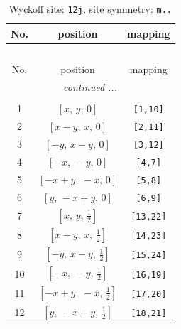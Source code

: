 \documentclass[fleqn,8pt]{jsarticle}
\begin{document}
\begin{longtable}{ccc}
\caption{Wyckoff site: {\tt 12j}, site symmetry: {\tt m..}}
 \\
 \hline \hline
No. & position & mapping \\ \hline \endfirsthead

\multicolumn{2}{l}{\tablename\ \thetable{}} \\
 \hline \hline
No. & position & mapping \\ \hline \endhead

 \hline \hline
\multicolumn{2}{r}{\footnotesize\it continued ...} \\ \endfoot

 \hline \hline
\multicolumn{2}{r}{} \\ \endlastfoot

1 & $\left[ x,\, y,\, 0 \right]$ & {\tt [1,10]} \\ \hline
2 & $\left[ x - y,\, x,\, 0 \right]$ & {\tt [2,11]} \\ \hline
3 & $\left[ - y,\, x - y,\, 0 \right]$ & {\tt [3,12]} \\ \hline
4 & $\left[ - x,\, - y,\, 0 \right]$ & {\tt [4,7]} \\ \hline
5 & $\left[ - x + y,\, - x,\, 0 \right]$ & {\tt [5,8]} \\ \hline
6 & $\left[ y,\, - x + y,\, 0 \right]$ & {\tt [6,9]} \\ \hline
7 & $\left[ x,\, y,\, \frac{1}{2} \right]$ & {\tt [13,22]} \\ \hline
8 & $\left[ x - y,\, x,\, \frac{1}{2} \right]$ & {\tt [14,23]} \\ \hline
9 & $\left[ - y,\, x - y,\, \frac{1}{2} \right]$ & {\tt [15,24]} \\ \hline
10 & $\left[ - x,\, - y,\, \frac{1}{2} \right]$ & {\tt [16,19]} \\ \hline
11 & $\left[ - x + y,\, - x,\, \frac{1}{2} \right]$ & {\tt [17,20]} \\ \hline
12 & $\left[ y,\, - x + y,\, \frac{1}{2} \right]$ & {\tt [18,21]} \\
\end{longtable}
\renewcommand{\arraystretch}{1.2}
\end{document}
